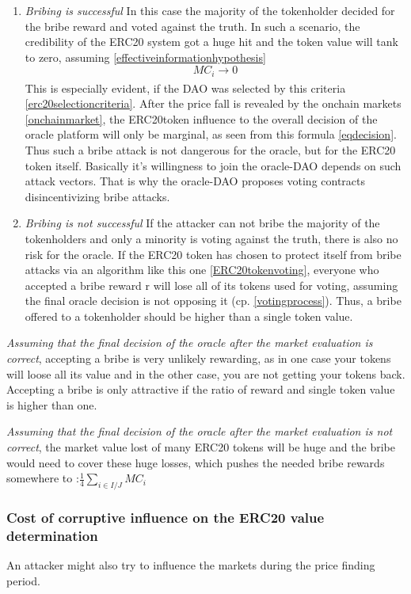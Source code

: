 \documentclass[a4paper]{article}
\begin{document}
\begin{enumerate}
\item \textit{Bribing is successful}
In this case the majority of the tokenholder decided for the bribe reward and voted against the truth. In such a scenario, the credibility of the ERC20 system got a huge hit and the token value will tank to zero, assuming \ref{effectiveinformationhypothesis}
$$MC_i \xrightarrow []{} 0$$
This is especially evident, if the DAO was selected by this criteria \ref{erc20selectioncriteria}.
After the price fall is revealed by the onchain markets \ref{onchainmarket}, the ERC20token influence to the overall decision of the oracle platform will only be marginal, as seen from this formula \ref{eqdecision}.
Thus such a bribe attack is not dangerous for the oracle, but for the ERC20 token itself. Basically it's willingness to join the oracle-DAO depends on such attack vectors. That is why the oracle-DAO proposes voting contracts disincentivizing bribe attacks.
\item \textit{Bribing is not successful}
If the attacker can not bribe the majority of the tokenholders and only a minority is  voting against the truth, there is also no risk for the oracle. If the ERC20 token has chosen to protect itself from bribe attacks via an algorithm like this one \ref{ERC20tokenvoting}, everyone who accepted a bribe reward r will lose all of its tokens used for voting, assuming the final oracle decision is not opposing it (cp. \ref{votingprocess}). Thus, a bribe offered to a tokenholder should be higher than a single token value.
\end{enumerate}
\textit{Assuming that the final decision of the oracle after the market evaluation is correct}, accepting a bribe is very unlikely rewarding, as in one case your tokens will loose all its value and in the other case, you are not getting your tokens back. Accepting a bribe is only attractive if the ratio of reward and single token value is higher than one.

\textit{Assuming that the final decision of the oracle after the market evaluation is not correct}, the market value lost of many ERC20 tokens will be huge and the bribe would need to cover these huge losses, which pushes the needed bribe rewards somewhere to :$ \frac{1}{4}\sum_{i\in I/J} MC_i $

\subsubsection*{Cost of corruptive influence on the ERC20 value determination }
An attacker might also try to influence the markets during the price finding period.
\end{document}
